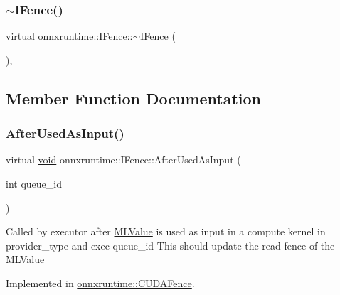 \subsubsection{\texorpdfstring{$\sim$\+I\+Fence()}{~IFence()}}
{\footnotesize\ttfamily virtual onnxruntime\+::\+I\+Fence\+::$\sim$\+I\+Fence (\begin{DoxyParamCaption}{ }\end{DoxyParamCaption})\hspace{0.3cm}{\ttfamily [virtual]}, {\ttfamily [default]}}



\subsection{Member Function Documentation}
\mbox{\label{classonnxruntime_1_1IFence_af35eb555df9118afd4686e55f41b62a2}} 
\subsubsection{\texorpdfstring{After\+Used\+As\+Input()}{AfterUsedAsInput()}}
{\footnotesize\ttfamily virtual \mbox{\hyperlink{mlasi_8h_a88f941d423cb2a819b70a1358982b1a6}{void}} onnxruntime\+::\+I\+Fence\+::\+After\+Used\+As\+Input (\begin{DoxyParamCaption}\item[{int}]{queue\+\_\+id }\end{DoxyParamCaption})\hspace{0.3cm}{\ttfamily [pure virtual]}}

Called by executor after \mbox{\hyperlink{classonnxruntime_1_1MLValue}{M\+L\+Value}} is used as input in a compute kernel in provider\+\_\+type and exec queue\+\_\+id This should update the read fence of the \mbox{\hyperlink{classonnxruntime_1_1MLValue}{M\+L\+Value}} 

Implemented in \mbox{\hyperlink{classonnxruntime_1_1CUDAFence_a21849fcb69441a710decac8f8c7c4145}{onnxruntime\+::\+C\+U\+D\+A\+Fence}}.

\mbox{\label{classonnxruntime_1_1IFence_aa0d10e238e95cd8b7fed01c8c70fa1cd}} 
